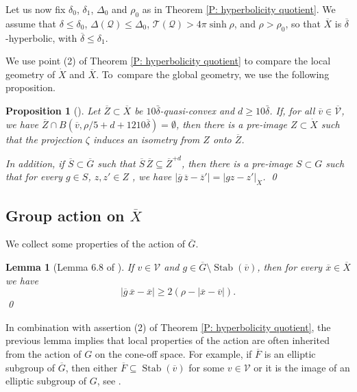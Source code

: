 \documentclass[11pt]{article}
\let\mathcal\mathscr
\theoremstyle{plain}
\newtheorem{prop}[thm]{Proposition}
\newtheorem{lem}[thm]{Lemma}
\theoremstyle{definition}
\newcommand{\cX}{\dot{X}}
\newcommand{\qX}{\overline{X}}
\newcommand{\q}[1]{\overline{#1}}
\newcommand{\stab}[1]{\operatorname{Stab}(#1)}
\begin{document}
Let us now fix $\delta_0$, $\delta_1$, $\Delta_0$ and $\rho_0$ as in Theorem \ref{P: hyperbolicity quotient}. We assume that $\delta \leq \delta_0$, $\Delta(\mathcal Q) \leq \Delta_0$, $\mathcal T(\mathcal Q) > 4\pi \sinh\rho$, and $\rho > \rho_0$, so that $\q X$ is $\q \delta$-hyperbolic, with $\q \delta \leq \delta_1$.

We use point (2) of Theorem \ref{P: hyperbolicity quotient} to compare the local geometry of $\cX $ and $\q X$. To~compare the global geometry, we use the following proposition.

\begin{prop}[{\cite[Prop.\,3.21]{coulon_geometry_2014}}]\label{L: lifts of quasi-convex} Let $\q Z\!\subset\!\q X$ be $10 \bar\delta$-quasi-convex and \hbox{$d\!\geqslant\!10 \bar\delta$}.
If, for all $\q v \in \q {\mathcal V}$, we have $\q Z \cap B(\q v, \rho/5 +d+ 1210 \q \delta) =\emptyset$, then there is a pre-image $Z \subset \cX$ such that the projection $\zeta$ induces an isometry from $Z$ onto $\q Z$.

In addition, if $\q S\subset \q G$ such that $\q S \, \q Z \subseteq {\q Z}^{+d}$, then there is a pre-image $S\subset G$ such that for every $g \in S$, $z,z' \in Z$
, we have $|\q g\, \q z -\q z '| =|g z-z'|_{\cX}$.
\qed
\end{prop}

\subsection{Group action on \texorpdfstring{$\qX$}{X}}

We collect some properties of the action of $\q G$.

\begin{lem}[Lemma 6.8 of \cite{coulon_geometry_2014}]\label{L: rotation quotient space} If $v\in \mathcal V$ and $g\in \q G \setminus \stab{\q v}$, then for every $\q x\in \qX$ we have
\begin{equation*}
|\q g \,\q x -\q x|\geqslant 2(\rho - |\q x -\q v|).
\end{equation*} \qed
\end{lem}

In combination with assertion (2) of Theorem \ref{P: hyperbolicity quotient}, the previous lemma implies that local properties of the action are often inherited from the action of $G$ on the cone-off space. For example, if $\q F$ is an elliptic subgroup of $\q G$, then either $\q F \subseteq \stab{\q v}$ for some $v\in \mathcal V$ or it is the image of an elliptic subgroup of $G$, see \cite[Prop.\,6.12]{coulon_geometry_2014}.
\end{document}
